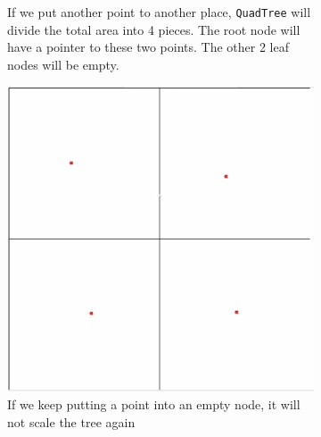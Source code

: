 \begin{center}
\begin{figure}[H]
\begin{subfigure}[t]{0.38\textwidth}
        \caption{If we put another point to another place, \texttt{QuadTree} will divide the total area into 4 pieces. The root node will have a pointer to these two points. The other 2 leaf nodes will be empty.}
        \label{fig:subfig3}
    \end{subfigure}

    \centering
    \begin{subfigure}[t]{0.38\textwidth}
        \centering
        \includegraphics[width=\linewidth]{images/task4_quad4.png}
        \caption{ If we keep putting a point into an empty node, it will not scale the tree again}
        \label{fig:subfig4}
    \end{subfigure}%
    \hspace{0.02\textwidth}
    \begin{subfigure}[t]{0.38\textwidth}
        \centering

\end{subfigure}
\end{figure}
\end{center}
